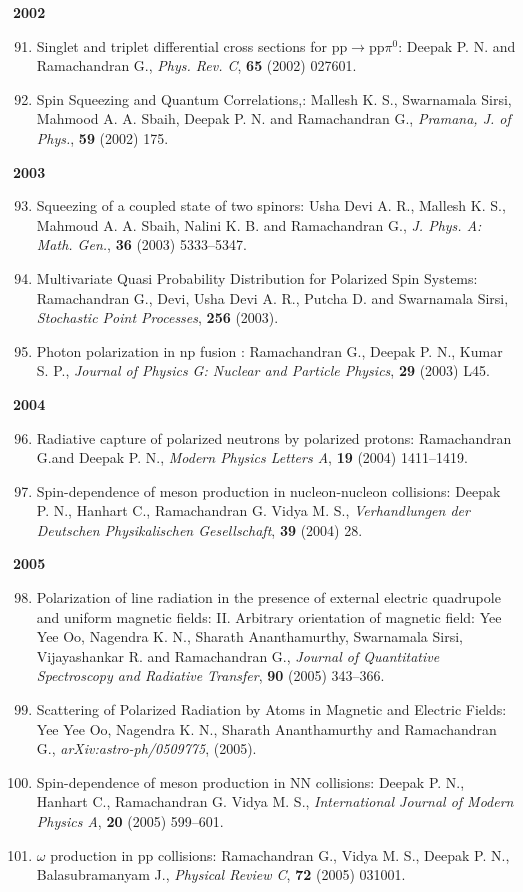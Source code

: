 \textbf{2002}
\begin{enumerate}
\setcounter{enumi}{90}
\item Singlet and triplet differential cross sections for pp$\to$pp$\pi^{0}$: Deepak P. N. and Ramachandran G., \textit{Phys. Rev. C}, {\bf 65} (2002) 027601.
\item Spin Squeezing and Quantum Correlations,: Mallesh K. S., Swarnamala Sirsi, Mahmood A. A. Sbaih, Deepak P. N. and Ramachandran G., \textit{Pramana, J. of
Phys.}, {\bf 59} (2002) 175.
\end{enumerate}
\textbf{2003}
\begin{enumerate}
\setcounter{enumi}{92}
\item Squeezing of a coupled state of two spinors: Usha Devi A. R., Mallesh K. S., Mahmoud A. A. Sbaih, Nalini K. B. and Ramachandran G., \textit{J. Phys. A: Math.
Gen.}, {\bf 36} (2003) 5333--5347.
\item Multivariate Quasi Probability Distribution for Polarized Spin Systems: Ramachandran G., Devi, Usha Devi A. R., Putcha D. and Swarnamala Sirsi, \textit{Stochastic Point Processes}, {\bf 256} (2003).
\item Photon polarization in np fusion : Ramachandran G., Deepak P. N., Kumar S. P., \textit{Journal of Physics G: Nuclear and Particle Physics}, {\bf 29} (2003) L45.
\end{enumerate}
\textbf{2004}
\begin{enumerate}
\setcounter{enumi}{95}
\item Radiative capture of polarized neutrons by polarized protons: Ramachandran G.and Deepak P. N., \textit{Modern Physics Letters A}, {\bf 19} (2004) 1411--1419.
\item Spin-dependence of meson production in nucleon-nucleon collisions: Deepak P. N., Hanhart C., Ramachandran G. Vidya M. S., \textit{Verhandlungen der Deutschen
Physikalischen Gesellschaft}, {\bf 39} (2004) 28.
\end{enumerate}
\textbf{2005}
\begin{enumerate}
\setcounter{enumi}{97}
\item Polarization of line radiation in the presence of external electric quadrupole and uniform magnetic fields: II. Arbitrary orientation of magnetic field: Yee Yee Oo, Nagendra K. N., Sharath Ananthamurthy, Swarnamala Sirsi, Vijayashankar R. and Ramachandran G., \textit{Journal of Quantitative Spectroscopy and Radiative Transfer}, {\bf 90} (2005) 343--366.
\item Scattering of Polarized Radiation by Atoms in Magnetic and Electric Fields: Yee Yee Oo, Nagendra K. N., Sharath Ananthamurthy and Ramachandran G., \textit{arXiv:astro-ph/0509775}, (2005).
\item Spin-dependence of meson production in NN collisions: Deepak P. N., Hanhart C., Ramachandran G. Vidya M. S., \textit{International Journal of Modern Physics A}, {\bf 20} (2005) 599--601.
\item $\omega$ production in pp collisions: Ramachandran G., Vidya M. S., Deepak P. N., Balasubramanyam J., \textit{Physical Review C}, {\bf 72} (2005) 031001.
\end{enumerate}
